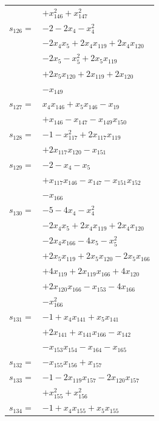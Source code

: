 \begin{longtable}{@{}r@{\;}l@{}}
 & \(\displaystyle +x_{146}^{2} +x_{147}^{2}\) \\[3pt]
\(s_{126}=\) & \(\displaystyle -2 -2x_{4} -x_{4}^{2}\) \\
 & \(\displaystyle -2x_{4}x_{5} +2x_{4}x_{119} +2x_{4}x_{120}\) \\
 & \(\displaystyle -2x_{5} -x_{5}^{2} +2x_{5}x_{119}\) \\
 & \(\displaystyle +2x_{5}x_{120} +2x_{119} +2x_{120}\) \\
 & \(\displaystyle -x_{149}\) \\[3pt]
\(s_{127}=\) & \(\displaystyle x_{4}x_{146} +x_{5}x_{146} -x_{19}\) \\
 & \(\displaystyle +x_{146} -x_{147} -x_{149}x_{150}\) \\[3pt]
\(s_{128}=\) & \(\displaystyle -1 -x_{117}^{2} +2x_{117}x_{119}\) \\
 & \(\displaystyle +2x_{117}x_{120} -x_{151}\) \\[3pt]
\(s_{129}=\) & \(\displaystyle -2 -x_{4} -x_{5}\) \\
 & \(\displaystyle +x_{117}x_{146} -x_{147} -x_{151}x_{152}\) \\
 & \(\displaystyle -x_{166}\) \\[3pt]
\(s_{130}=\) & \(\displaystyle -5 -4x_{4} -x_{4}^{2}\) \\
 & \(\displaystyle -2x_{4}x_{5} +2x_{4}x_{119} +2x_{4}x_{120}\) \\
 & \(\displaystyle -2x_{4}x_{166} -4x_{5} -x_{5}^{2}\) \\
 & \(\displaystyle +2x_{5}x_{119} +2x_{5}x_{120} -2x_{5}x_{166}\) \\
 & \(\displaystyle +4x_{119} +2x_{119}x_{166} +4x_{120}\) \\
 & \(\displaystyle +2x_{120}x_{166} -x_{153} -4x_{166}\) \\
 & \(\displaystyle -x_{166}^{2}\) \\[3pt]
\(s_{131}=\) & \(\displaystyle -1 +x_{4}x_{141} +x_{5}x_{141}\) \\
 & \(\displaystyle +2x_{141} +x_{141}x_{166} -x_{142}\) \\
 & \(\displaystyle -x_{153}x_{154} -x_{164} -x_{165}\) \\[3pt]
\(s_{132}=\) & \(\displaystyle -x_{155}x_{156} +x_{157}\) \\[3pt]
\(s_{133}=\) & \(\displaystyle -1 -2x_{119}x_{157} -2x_{120}x_{157}\) \\
 & \(\displaystyle +x_{155}^{2} +x_{156}^{2}\) \\[3pt]
\(s_{134}=\) & \(\displaystyle -1 +x_{4}x_{155} +x_{5}x_{155}\) \\

\end{longtable}
